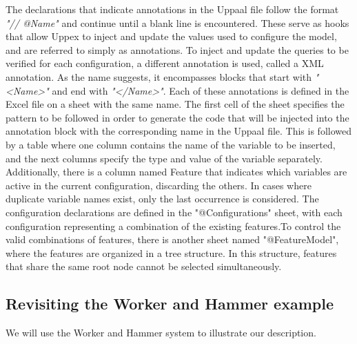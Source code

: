 The declarations that indicate annotations in the Uppaal file follow the format \textit{"// @Name"} and continue until a blank line is encountered. These serve as hooks that allow Uppex to inject and update the values used to configure the model, and are referred to simply as annotations. To inject and update the queries to be verified for each configuration, a different annotation is used, called a XML annotation. As the name suggests, it encompasses blocks that start with \textit{"<Name>"} and end with \textit{"</Name>"}. Each of these annotations is defined in the Excel file on a sheet with the same name. The first cell of the sheet specifies the pattern to be followed in order to generate the code that will be injected into the annotation block with the corresponding name in the Uppaal file. This is followed by a table where one column contains the name of the variable to be inserted, and the next columns specify the type and value of the variable separately. Additionally, there is a column named Feature that indicates which variables are active in the current configuration, discarding the others. In cases where duplicate variable names exist, only the last occurrence is considered. The configuration declarations are defined in the "@Configurations" sheet, with each configuration representing a combination of the existing features.To control the valid combinations of features, there is another sheet named "@FeatureModel", where the features are organized in a tree structure. In this structure, features that share the same root node cannot be selected simultaneously.

\subsection*{Revisiting the Worker and Hammer example}

We will use the Worker and Hammer system to illustrate our description.





